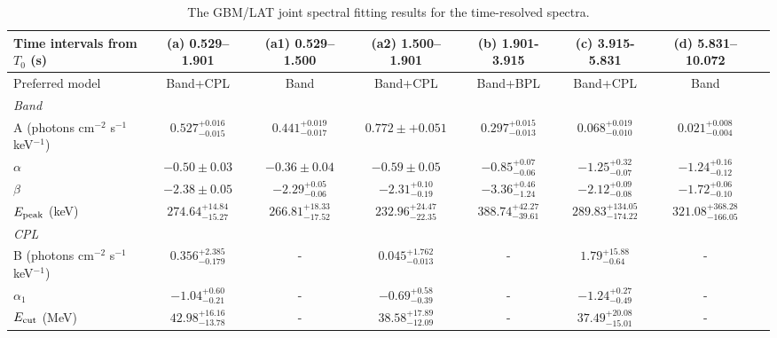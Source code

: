 \documentclass[twocolumn]{aastex631}
\begin{document}
\begin{table}
\begin{small}
\caption{The GBM/LAT joint spectral fitting results for the time-resolved spectra.}
\label{tab:spec_4bin}
\begin{center}
\begin{tabular}{p{4.5cm}ccccccc}
\hline \hline
Time intervals from $T_0$ (s)    & (a) 0.529--1.901  & (a1) 0.529--1.500  & (a2) 1.500--1.901 &  (b) 1.901-3.915 & (c) 3.915-5.831 & (d) 5.831--10.072 \\ \hline 
Preferred model  &  Band+CPL &  Band &  Band+CPL & Band+BPL & Band+CPL  & Band\\ \hline 
\multicolumn{1}{l}{\it Band }\\
A (photons cm$^{-2}$ s$^{-1}$ keV$^{-1}$) 
                      & $0.527_{-0.015}^{+0.016}$ & $0.441_{-0.017}^{+0.019}$ & $0.772\pm+0.051$ & $0.297_{-0.013}^{+0.015}$  & $0.068_{-0.010}^{+0.019}$ &  $0.021_{-0.004}^{+0.008}$ \\
$\alpha$     & $-0.50\pm0.03$ & $-0.36\pm0.04$ & $-0.59\pm0.05$ & $-0.85_{-0.06}^{+0.07}$  & $-1.25_{-0.07}^{+0.32}$ & $-1.24_{-0.12}^{+0.16}$ \\
$\beta$      & $-2.38\pm0.05$ & $-2.29_{-0.06}^{+0.05}$ & $-2.31_{-0.19}^{+0.10}$ & $-3.36_{-1.24}^{+0.46}$ & $-2.12_{-0.08}^{+0.09}$ & $-1.72_{-0.10}^{+0.06}$  \\      
$E_{\rm{peak}}$ (keV) & $274.64_{-15.27}^{+14.84}$  & $266.81_{-17.52}^{+18.33}$ & $232.96_{-22.35}^{+24.47}$ & $388.74_{-39.61}^{+42.27}$   & $289.83_{-174.22}^{+134.05}$ & $321.08_{-166.05}^{+368.28}$ \\\hline

\multicolumn{1}{l}{\it CPL}\\
B (photons cm$^{-2}$ s$^{-1}$ keV$^{-1}$)            &$0.356_{-0.179}^{+2.385}$&-&$0.045_{-0.013}^{+1.762}$&- &$1.79_{-0.64}^{+15.88}$        & -   \\
$\alpha_1$                                           &$-1.04_{-0.21}^{+0.60}$&-&$-0.69_{-0.39}^{+0.58}$& -&$-1.24_{-0.49}^{+0.27}$      & -    \\ 
$E_{\rm cut}$ (MeV)                                  &$42.98_{-13.78}^{+16.16}$&-&$38.58_{-12.09}^{+17.89}$& -&$37.49_{-15.01}^{+20.08}$       & - \\ \hline




\end{tabular}
\end{center}
\end{small}
\end{table}
\end{document}
